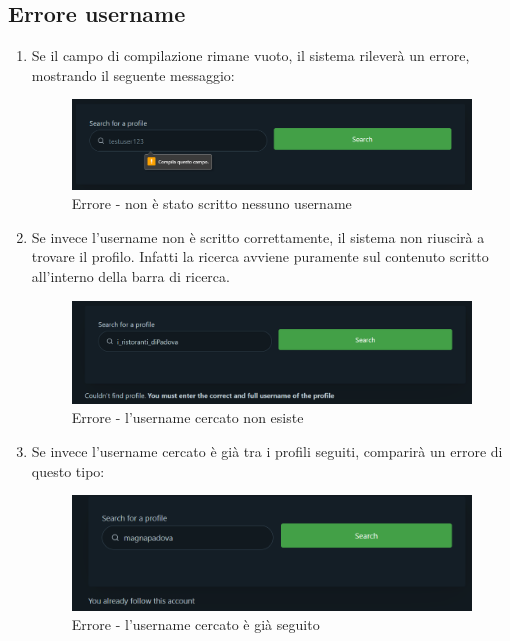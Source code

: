 {    \subsection{Errore username} {
    \begin{enumerate}
        \item Se il campo di compilazione rimane vuoto, il sistema rileverà un errore, mostrando il seguente messaggio: 
        \begin{figure}[H]
            \includegraphics[width=12cm]{sezioni/images/err1-add.png}
            \centering
            \caption{Errore - non è stato scritto nessuno username}
        \end{figure}
        \item Se invece l'username non è scritto correttamente, il sistema non riuscirà a trovare il profilo. Infatti la ricerca avviene puramente sul contenuto scritto all'interno della barra di ricerca.
        \begin{figure}[H]
            \includegraphics[width=12cm]{sezioni/images/err2-add.png}
            \centering
            \caption{Errore - l'username cercato non esiste}
        \end{figure}
        \item Se invece l'username cercato è già tra i profili seguiti, comparirà un errore di questo tipo:
        \begin{figure}[H]
            \includegraphics[width=12cm]{sezioni/images/err3-add.png}
            \centering
            \caption{Errore - l'username cercato è già seguito}
        \end{figure}
    \end{enumerate}
    }
}
